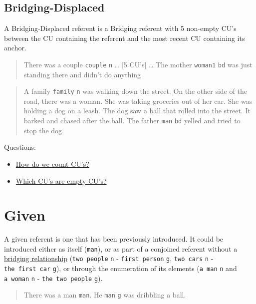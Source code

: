 \documentclass[
]{book}
\providecommand{\tightlist}{%
  \setlength{\itemsep}{0pt}\setlength{\parskip}{0pt}}
\begin{document}
\hypertarget{bridging-displaced}{%
\subsection{Bridging-Displaced}\label{bridging-displaced}}

A Bridging-Displaced referent is a Bridging referent with 5 non-empty CU's between the CU containing the referent and the most recent CU containing its anchor.

\begin{quote}
There was a couple \texttt{couple} \texttt{n} \ldots{}
{[}5 CU's{]} \ldots{}
The mother \texttt{woman1} \texttt{bd} was just standing there and didn't do anything
\end{quote}

\begin{quote}
A family \texttt{family} \texttt{n} was walking down the street.
On the other side of the road, there was a woman.
She was taking groceries out of her car.
She was holding a dog on a leash.
The dog saw a ball that rolled into the street.
It barked and chased after the ball.
The father \texttt{man} \texttt{bd} yelled and tried to stop the dog.
\end{quote}

Questions:

\begin{itemize}
\tightlist
\item
  \protect\hyperlink{counting-cus}{How do we count CU's?}
\item
  \protect\hyperlink{empty-cus}{Which CU's are empty CU's?}
\end{itemize}

\hypertarget{given}{%
\section{Given}\label{given}}

A given referent is one that has been previously introduced.
It could be introduced either as itself (\texttt{man}),
or as part of a conjoined referent without a \protect\hyperlink{bridging-relationships}{bridging relationship}
(\texttt{two\ people} \texttt{n} - \texttt{first\ person} \texttt{g}, \texttt{two\ cars} \texttt{n} - \texttt{the\ first\ car} \texttt{g}),
or through the enumeration of its elements (\texttt{a\ man} \texttt{n} and \texttt{a\ woman} \texttt{n} - \texttt{the\ two\ people} \texttt{g}).

\begin{quote}
There was a man \texttt{man}.
He \texttt{man} \texttt{g} was dribbling a ball.
\end{quote}
\end{document}
